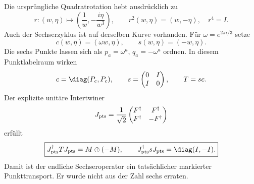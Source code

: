 Die ursprüngliche Quadratrotation hebt ausdrücklich zu
\begin{equation}
r:(w,\eta)\longmapsto
\left(\frac1w,-\frac{i\eta}{w^3}\right),\qquad
r^2(w,\eta)=(w,-\eta),\quad r^4=I.
\end{equation}
Auch der Sechserzyklus ist auf derselben Kurve vorhanden. Für $\omega=e^{2\pi i/3}$ setze
\begin{equation}
c(w,\eta)=(\omega w,\eta),\qquad
s(w,\eta)=(-w,\eta).
\end{equation}
Die sechs Punkte lassen sich als $p_a=\omega^a$, $q_a=-\omega^a$ ordnen. In diesem Punktlabelraum wirken
\begin{equation}
c=\diag(P_c,P_c),\qquad
s=\begin{pmatrix}0&I\\I&0\end{pmatrix},\qquad T=sc.
\end{equation}
Der explizite unitäre Intertwiner
\begin{equation}
J_{\rm pts}=\frac1{\sqrt2}
\begin{pmatrix}F^\dagger&F^\dagger\\F^\dagger&-F^\dagger\end{pmatrix}
\end{equation}
erfüllt
\begin{equation}\label{eq:pointhexagon}
\boxed{J_{\rm pts}^\dagger TJ_{\rm pts}=M\oplus(-M),\qquad
J_{\rm pts}^\dagger sJ_{\rm pts}=\diag(I,-I).}
\end{equation}
Damit ist der endliche Sechseroperator ein tatsächlicher markierter Punkttransport. Er wurde nicht aus der Zahl sechs erraten.

\begin{center}
\end{center}

